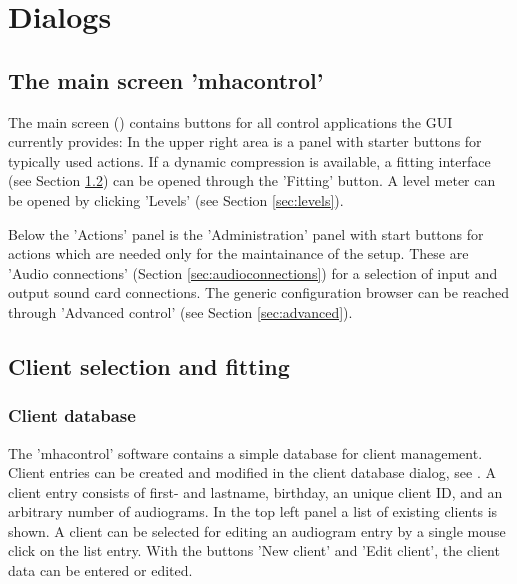 \documentclass[11pt,a4paper,twoside]{article}
\newcommand{\+}{\discretionary{\mbox{\scriptsize$\hookleftarrow$}}{}{}}
\begin{document}
\section{Dialogs}

\subsection{The main screen 'mhacontrol'}

The main screen () contains buttons for all control applications the GUI currently provides:
%
In the upper right area is a panel with starter buttons for typically
used actions.
%
If a dynamic compression is available, a fitting interface (see
Section \ref{sec:fitting}) can be opened through the 'Fitting' button.
%
A level meter can be opened by clicking 'Levels' (see Section
\ref{sec:levels}).

Below the 'Actions' panel is the 'Administration'
panel with start buttons for actions which are
needed only for the maintainance of the \mha{} setup.
%
These are 'Audio connections' (Section \ref{sec:audioconnections}) for
a selection of input and output sound card connections.
%
The generic \mha{} configuration browser can be reached through 'Advanced
control' (see Section \ref{sec:advanced}).


\subsection{Client selection and fitting}\label{sec:fitting}

\subsubsection*{Client database}

The 'mhacontrol' software contains a simple database for client management.
%
Client entries can be created and modified in the client database
dialog, see .
%
A client entry consists of first- and lastname, birthday, an unique
client ID, and an arbitrary number of
audiograms.
%
In the top left panel a list of existing clients is shown.
%
A client can be selected for editing an audiogram entry by a single
mouse click on the list entry.
%
With the buttons 'New client' and 'Edit client', the client data can
be entered or edited.
\end{document}
